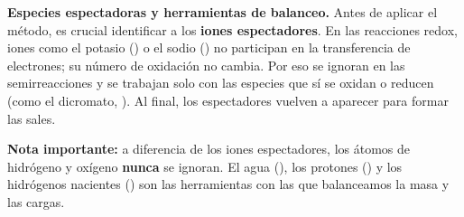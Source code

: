 \textbf{Especies espectadoras y herramientas de balanceo.}
Antes de aplicar el método, es crucial identificar a los \textbf{iones espectadores}. En las reacciones redox, iones como el potasio () o el sodio () no participan en la transferencia de electrones; su número de oxidación no cambia. Por eso se ignoran en las semirreacciones y se trabajan solo con las especies que sí se oxidan o reducen (como el dicromato, ). Al final, los espectadores vuelven a aparecer para formar las sales.

\textbf{Nota importante:} a diferencia de los iones espectadores, los átomos de hidrógeno y oxígeno \textbf{nunca} se ignoran. El agua (), los protones () y los hidrógenos nacientes (\ce{[H]}) son las herramientas con las que balanceamos la masa y las cargas.

